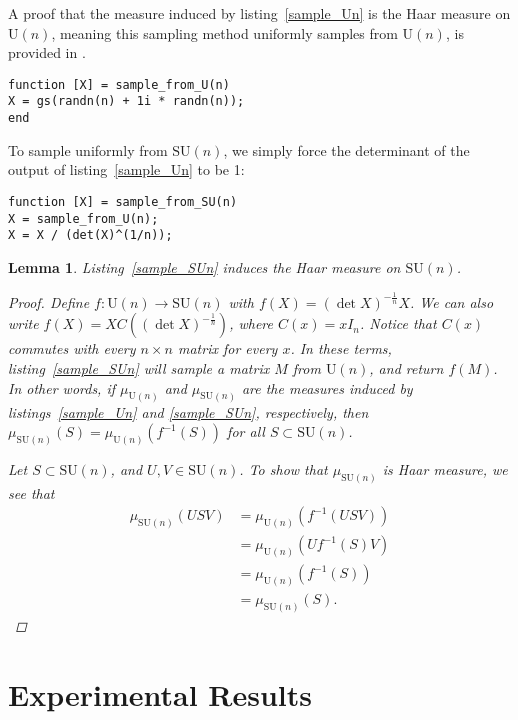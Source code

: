\documentclass[letterpaper,11pt]{article}
\newtheorem{lemma}{Lemma}
\newcommand{\MG}[2]{{\text{#1}(#2)}}
\newcommand{\Un}{\MG{U}{n}}
\newcommand{\SUn}{\MG{SU}{n}}
\begin{document}
A proof that the measure induced by listing~\ref{sample_Un} is the Haar
  measure on $\Un$, meaning this sampling method uniformly samples from $\Un$,
  is provided in \cite{Mezzadri2007}.

\begin{lstlisting}[label=sample_Un,caption=Sampling from $\Un$]
function [X] = sample_from_U(n)
X = gs(randn(n) + 1i * randn(n));
end
\end{lstlisting}

To sample uniformly from $\SUn$, we simply force the determinant of the
  output of listing~\ref{sample_Un} to be 1:

\begin{lstlisting}[label=sample_SUn,caption=Sampling from $\SUn$]
function [X] = sample_from_SU(n)
X = sample_from_U(n);
X = X / (det(X)^(1/n));
\end{lstlisting}

\begin{lemma}
Listing~\ref{sample_SUn} induces the Haar measure on $\SUn$.

\begin{proof}
Define $f:\Un\to\SUn$ with $f(X) = (\det X)^{-\frac{1}{n}}X$.
We can also write $f(X) = XC \left((\det X)^{-\frac{1}{n}} \right)$, where $C(x)=xI_n$.
Notice that $C(x)$ commutes with every $n\times n$ matrix for every $x$.
In these terms, listing~\ref{sample_SUn} will sample a matrix $M$ from $\Un$,
  and return $f(M)$.
In other words, if $\mu_\Un$ and $\mu_\SUn$ are the measures induced by
  listings~\ref{sample_Un} and \ref{sample_SUn}, respectively, then
  $\mu_\SUn(S) = \mu_\Un \left(f^{-1}(S) \right)$ for all $S\subset\SUn$.

Let $S\subset \SUn$, and $U,V\in \SUn$.
To show that $\mu_\SUn$ is Haar measure, we see that
\begin{align}
  \mu_\SUn\left(USV\right)  &= \mu_\Un\left(f^{-1}(USV)\right) \\
                            &= \mu_\Un\left(Uf^{-1}(S)V\right) \\
                            &= \mu_\Un\left(f^{-1}(S)\right) \\
                            &= \mu_\SUn\left(S\right).
\end{align}
\end{proof}
\end{lemma}

\section{Experimental Results}

\thispagestyle{empty}


\end{document}
